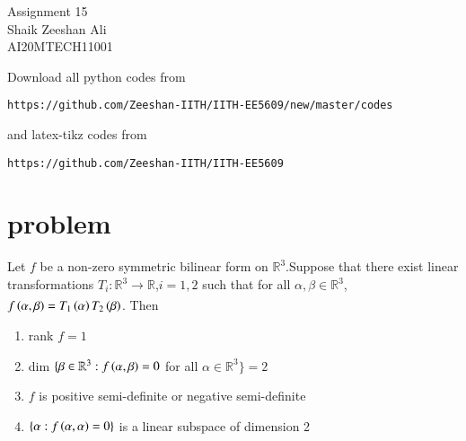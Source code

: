 \documentclass[journal,12pt]{IEEEtran}
\begin{document}
\renewcommand{\thefigure}{\theproblem}
\def\putbox#1#2#3{\makebox[0in][l]{\makebox[#1][l]{}\raisebox{\baselineskip}[0in][0in]{\raisebox{#2}[0in][0in]{#3}}}}
     \def\rightbox#1{\makebox[0in][r]{#1}}
     \def\centbox#1{\makebox[0in]{#1}}
     \def\topbox#1{\raisebox{-\baselineskip}[0in][0in]{#1}}
     \def\midbox#1{\raisebox{-0.5\baselineskip}[0in][0in]{#1}}
\vspace{2cm}
\begin{center}
\huge Assignment 15\\
\large Shaik Zeeshan Ali\\
\large AI20MTECH11001\\
\end{center}
Download all python codes from 
\begin{lstlisting}
https://github.com/Zeeshan-IITH/IITH-EE5609/new/master/codes
\end{lstlisting}
and latex-tikz codes from 
\begin{lstlisting}
https://github.com/Zeeshan-IITH/IITH-EE5609
\end{lstlisting}
\section{problem}
Let $f$ be a non-zero symmetric bilinear form on $\mathbb{R}^3$.Suppose that there exist linear transformations $T_i:\mathbb{R}^3\xrightarrow[]{}\mathbb{R}$,$i=1,2$ such that for all $\alpha,\beta\in\mathbb{R}^3$, $f\left(\alpha,\beta\right)=T_1\left(\alpha\right)T_2\left(\beta\right)$. Then
\begin{enumerate}
    \item rank $f=1$
    \item dim $\{\beta\in\mathbb{R}^3:f\left(\alpha,\beta\right)=0$ for all $\alpha\in\mathbb{R}^3\}=2$
    \item $f$ is positive semi-definite or negative semi-definite
    \item $\{\alpha:f\left(\alpha,\alpha\right)=0\}$ is a linear subspace of dimension 2
\end{enumerate}
\end{document}
